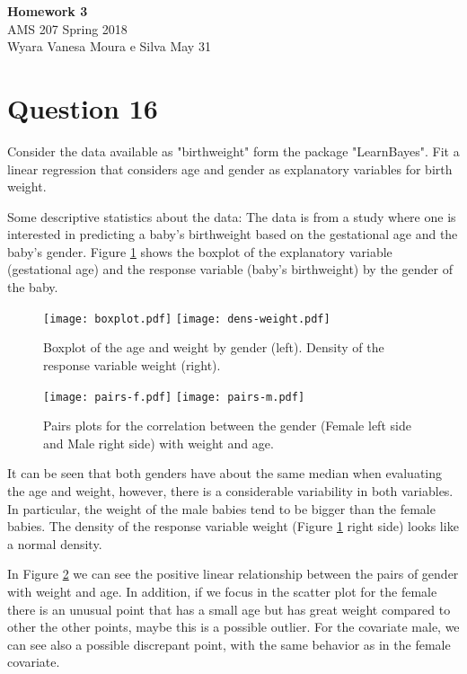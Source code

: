 \documentclass[a4paper, 11pt]{article}
\begin{document}
\noindent
{\Large\textbf{Homework 3} \hfill \\
AMS 207 \hfill Spring 2018 \\
Wyara Vanesa Moura e Silva \hfill May 31\\}

\section*{Question 16}

Consider the data available as "birthweight" form the package "LearnBayes". Fit a linear regression that considers age and gender as explanatory variables for birth weight. 

Some descriptive statistics about the data:
The data is from a study where one is interested in predicting a baby's birthweight based on the gestational age and the baby's gender. Figure \ref{Box-Dens} shows the boxplot of the explanatory variable (gestational age) and the response variable (baby's birthweight) by the gender of the baby. 

\begin{figure}[H]
\centering
\texttt{[image: boxplot.pdf]} 
\texttt{[image: dens-weight.pdf]} 
\caption{Boxplot of the age and weight by gender (left). Density of the response variable weight (right).}
\label{Box-Dens}
\end{figure}

\begin{figure}[H]
\centering
\texttt{[image: pairs-f.pdf]} 
\texttt{[image: pairs-m.pdf]} 
\caption{Pairs plots for the correlation between the gender (Female left side and Male right side) with weight and age.}
\label{Pairs}
\end{figure}

It can be seen that both genders have about the same median when evaluating the age and weight, however, there is a considerable variability in both variables. In particular, the weight of the male babies tend to be bigger than the female babies. The density of the response variable weight (Figure \ref{Box-Dens} right side) looks like a normal density.

In Figure \ref{Pairs} we can see the positive linear relationship between the pairs of gender with weight and age. In addition, if we focus in the scatter plot for the female there is an unusual point that has a small age but has great weight compared to other the other points, maybe this is a possible outlier. For the covariate male, we can see also a possible discrepant point, with the same behavior as in the female covariate.
\end{document}
